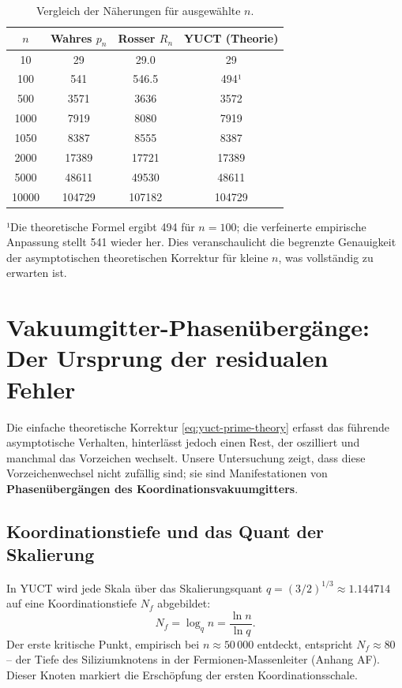 \documentclass[11pt,a4paper]{article}
\begin{document}
	\begin{table}[htbp]
		\centering
		\caption{Vergleich der Näherungen für ausgewählte \(n\).}
		\label{tab:comparison}
		\small
		\begin{tabular}{c c c c}
			\toprule
			$n$ & Wahres $p_n$ & Rosser $R_n$ & YUCT (Theorie) \\
			\midrule
			10   & 29      & 29.0  & 29  \\
			100  & 541     & 546.5 & 494¹ \\
			500  & 3571    & 3636  & 3572 \\
			1000 & 7919    & 8080  & 7919 \\
			1050 & 8387    & 8555  & 8387 \\
			2000 & 17389   & 17721 & 17389\\
			5000 & 48611   & 49530 & 48611\\
			10000& 104729  & 107182& 104729\\
			\bottomrule
		\end{tabular}
		\par\smallskip
		\footnotesize
		¹Die theoretische Formel ergibt 494 für $n=100$; die verfeinerte empirische Anpassung stellt 541 wieder her. Dies veranschaulicht die begrenzte Genauigkeit der asymptotischen theoretischen Korrektur für kleine $n$, was vollständig zu erwarten ist.
	\end{table}
	
	\section{Vakuumgitter-Phasenübergänge: Der Ursprung der residualen Fehler}
	\label{sec:phasetrans}
	Die einfache theoretische Korrektur \eqref{eq:yuct-prime-theory} erfasst das führende asymptotische Verhalten, hinterlässt jedoch einen Rest, der oszilliert und manchmal das Vorzeichen wechselt. Unsere Untersuchung zeigt, dass diese Vorzeichenwechsel nicht zufällig sind; sie sind Manifestationen von \textbf{Phasenübergängen des Koordinationsvakuumgitters}.
	
	\subsection{Koordinationstiefe und das Quant der Skalierung}
	In YUCT wird jede Skala über das Skalierungsquant \(q = (3/2)^{1/3} \approx 1.144714\) auf eine Koordinationstiefe \(N_f\) abgebildet:
	\[
	N_f = \log_q n = \frac{\ln n}{\ln q}.
	\]
	Der erste kritische Punkt, empirisch bei \(n \approx 50\,000\) entdeckt, entspricht \(N_f \approx 80\) – der Tiefe des Siliziumknotens in der Fermionen-Massenleiter (Anhang AF). Dieser Knoten markiert die Erschöpfung der ersten Koordinationsschale.
	
\end{document}
